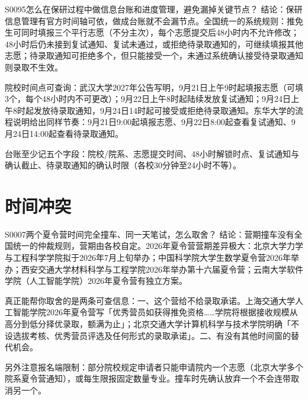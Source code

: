\begin{qa}{S0095}{怎么在保研过程中做信息台账和进度管理，避免漏掉关键节点？}
结论：保研信息管理有官方时间轴可依，做成台账就不会漏节点。全国统一的系统规则：推免生可同时填报三个平行志愿（不分主次），每个志愿提交后48小时内不允许修改；48小时后仍未接到复试通知、复试未通过，或拒绝待录取通知的，可继续填报其他志愿；待录取通知可拒绝多个，但只能接受一个，未通过系统确认接受待录取通知则录取不生效。

院校时间点可查询：武汉大学2027年公告写明，9月21日上午9时起填报志愿（可填3个，每个48小时内不可更改）；9月22日上午8时起陆续发放复试通知；9月24日上午8时起发放待录取通知，9月24日14时起可接受或拒绝待录取通知。东华大学的流程说明给出同样节奏：9月21日9:00起填报志愿、9月22日8:00起查看复试通知、9月24日14:00起查看待录取通知。

台账至少记五个字段：院校/院系、志愿提交时间、48小时解锁时点、复试通知与确认截止、待录取通知的确认时限（各校30分钟至24小时不等）。
\end{qa}

\section{时间冲突}
\begin{qa}{S0007}{两个夏令营时间完全撞车、同一天笔试，怎么取舍？}
结论：营期撞车没有全国统一的仲裁规则，营期由各校自定。2026年夏令营营期差异极大：北京大学力学与工程科学学院拟于2026年7月上旬举办；中国科学院大学生数学夏令营2026年举办；西安交通大学材料科学与工程学院2026年举办第十六届夏令营；云南大学软件学院（人工智能学院）2026年夏令营有独立方案。

真正能帮你取舍的是两条可查信息：一、这个营给不给录取承诺。上海交通大学人工智能学院2026年夏令营写「优秀营员如获得推免资格……学院将根据接收规模从高分到低分择优录取，额满为止」；北京交通大学计算机科学与技术学院明确「不设选拔考核、优秀营员评选及任何形式的录取承诺」。二、有没有其他时间窗的替代机会。

另外注意报名端限制：部分院校规定申请者只能申请院内一个志愿（北京大学多个院系夏令营通知），或每生限报固定数量专业。撞车时先确认放弃一个不会连带取消另一个。
\end{qa}

